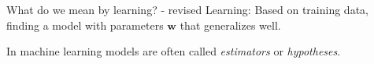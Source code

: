 \documentclass[dvipsnames]{beamer}
\begin{document}
		\begin{frame}{What do we mean by learning? - revised} %
		Learning: Based on training data, finding a model with parameters $\boldsymbol{w}$ that generalizes well.  %
		
		In machine learning models are often called \emph{estimators} or \emph{hypotheses}.
    \end{frame}
		
\end{document}
